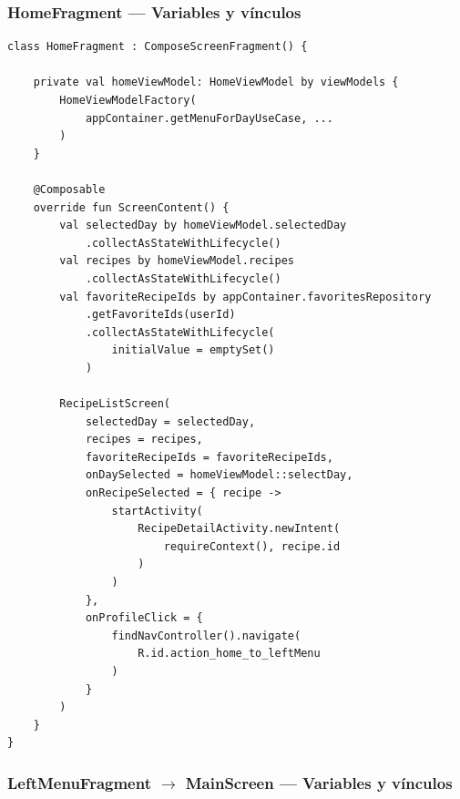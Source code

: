 \documentclass[stu, 12pt, letterpaper, donotrepeattitle, floatsintext, natbib]{apa7}
\begin{document}
\subsubsection{HomeFragment --- Variables y vínculos}

\begin{lstlisting}[caption={Variables y vínculos en HomeFragment.kt}]
class HomeFragment : ComposeScreenFragment() {

    private val homeViewModel: HomeViewModel by viewModels {
        HomeViewModelFactory(
            appContainer.getMenuForDayUseCase, ...
        )
    }

    @Composable
    override fun ScreenContent() {
        val selectedDay by homeViewModel.selectedDay
            .collectAsStateWithLifecycle()
        val recipes by homeViewModel.recipes
            .collectAsStateWithLifecycle()
        val favoriteRecipeIds by appContainer.favoritesRepository
            .getFavoriteIds(userId)
            .collectAsStateWithLifecycle(
                initialValue = emptySet()
            )

        RecipeListScreen(
            selectedDay = selectedDay,
            recipes = recipes,
            favoriteRecipeIds = favoriteRecipeIds,
            onDaySelected = homeViewModel::selectDay,
            onRecipeSelected = { recipe ->
                startActivity(
                    RecipeDetailActivity.newIntent(
                        requireContext(), recipe.id
                    )
                )
            },
            onProfileClick = {
                findNavController().navigate(
                    R.id.action_home_to_leftMenu
                )
            }
        )
    }
}
\end{lstlisting}

\subsubsection{LeftMenuFragment $\rightarrow$ MainScreen --- Variables y vínculos}
\end{document}
